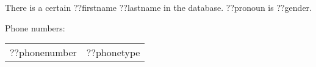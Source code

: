 \documentclass[a4paper]{article}
\begin{document}
\newcommand{\texdbconnectionnet}[2]{}
\newcommand{\texdbdef}[3]{}
\newcommand{\texdbfor}[2]{#2}
\newcommand{\texdbif}[2]{#2}
\newcommand{\texdbcommand}[1]{}
\texdbconnectionnet{Mono.Data.Sqlite}{URI=file:kleinertest.db3}
\texdbdef{??personqry}{select id, firstname, lastname, gender, gender from person where lastname LIKE ??1}{??id,??firstname,??lastname,??gender/m/male/f/female,??pronoun/m/He/f/She}
\texdbdef{??phoneqry}{select phonenumber, phonetype from telephone where fk_person = ??id}{??phonenumber,??phonetype}
\texdbfor{??personqry}{There is a certain ??firstname ??lastname in the database. ??pronoun is ??gender.

\texdbif{??phoneqry}{
Phone numbers:

  \begin{tabular}{ll}
\texdbfor{??phoneqry}{??phonenumber & ??phonetype \\}
\end{tabular}
}}
\end{document}
